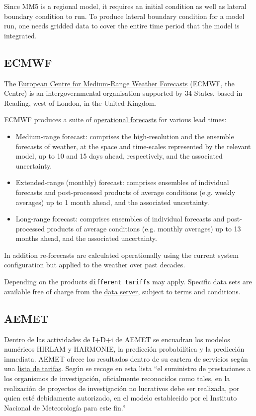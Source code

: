 \documentclass[11pt]{article}
\begin{document}
Since MM5 is a regional model, it requires an initial condition as
well as lateral boundary condition to run. To produce lateral
boundary condition for a model run, one needs gridded data to
cover the entire time period that the model is integrated.


\subsection{ECMWF}
\label{sec-2-4}

The \href{http://www.ecmwf.int/en/about}{European Centre for Medium-Range Weather Forecasts} (ECMWF, the
Centre) is an intergovernmental organisation supported by 34
States, based in Reading, west of London, in the United Kingdom.

ECMWF produces a suite of \href{http://www.ecmwf.int/en/forecasts}{operational forecasts} for various lead
times:

\begin{itemize}
\item Medium-range forecast: comprises the high-resolution and the
ensemble forecasts of weather, at the space and time-scales
represented by the relevant model, up to 10 and 15 days ahead,
respectively, and the associated uncertainty.
\item Extended-range (monthly) forecast: comprises ensembles of
individual forecasts and post-processed products of average
conditions (e.g. weekly averages) up to 1 month ahead, and the
associated uncertainty.
\item Long-range forecast: comprises ensembles of individual forecasts
and post-processed products of average conditions (e.g. monthly
averages) up to 13 months ahead, and the associated uncertainty.
\end{itemize}

In addition re-forecasts are calculated operationally using the
current system configuration but applied to the weather over past
decades. 

Depending on the products \texttt{different tariffs} may apply. Specific
data sets are available free of charge from the \href{http://data-portal.ecmwf.int/}{data server},
subject to terms and conditions.

\subsection{AEMET}
\label{sec-2-5}

Dentro de las actividades de I+D+i de AEMET se encuadran los
modelos numéricos HIRLAM y HARMONIE, la predicción probabilítica y
la predicción inmediata. AEMET ofrece los resultados dentro de su
cartera de servicios según una \href{https://sede.aemet.gob.es/documentos/es/servicios/publicos/AEMET/solicitudes/20060201.pdf}{lista de tarifas}. Según se recoge
en esta lista ``el suministro de prestaciones a los organismos de
investigación, oficialmente reconocidos como tales, en la
realización de proyectos de investigación no lucrativos debe ser
realizada, por quien esté debidamente autorizado, en el modelo
establecido por el Instituto Nacional de Meteorología para este
fin.''
\end{document}
